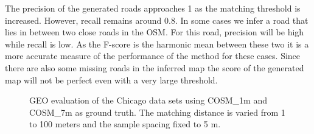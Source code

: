 The precision of the generated roads approaches 1 as the matching threshold is increased. However, recall remains around 0.8. In some cases we infer a road that lies in between two close roads in the \ac{OSM}. For this road, precision will be high while recall is low. As the F-score is the harmonic mean between these two it is a more accurate measure of the performance of the method for these cases. Since there are also some missing roads in the inferred map the score of the generated map will not be perfect even with a very large threshold.

\begin{figure}[H]%
  \caption{GEO evaluation of the Chicago data sets using COSM\_1m and COSM\_7m as ground truth. The matching distance is varied from 1 to 100 meters and the sample spacing fixed to 5 m.}%
 \label{fig:results/geo_match_dist_ch}
\end{figure}


